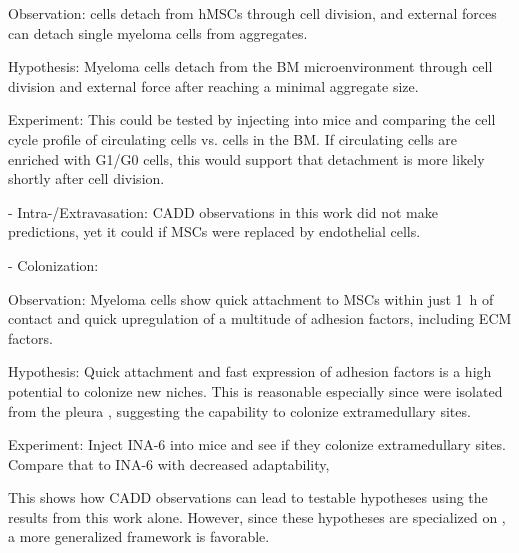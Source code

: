 Observation: \INA  cells detach from \acp{hMSC} through cell division, and external forces can detach
single myeloma cells from aggregates.

Hypothesis: Myeloma cells detach from the BM microenvironment through
cell division and external force after reaching a minimal aggregate size.

Experiment: This could be tested by injecting \INA  into mice and comparing the
cell cycle profile of circulating cells vs. cells in the BM. If circulating
cells are enriched with G1/G0 cells, this would support that detachment is more
likely shortly after cell division.


- Intra-/Extravasation: CADD observations in this work did not make predictions, yet it could if MSCs were replaced by endothelial cells.


- Colonization:

Observation: Myeloma cells show quick attachment to MSCs within just
\SI{1}{\hour} of contact and quick upregulation of a multitude of adhesion
factors, including \ac{ECM} factors.

Hypothesis: Quick attachment and fast expression of adhesion factors is a high
potential to colonize new niches. This is reasonable especially since \INA were
isolated from the pleura \cite{burgerGp130RasMediated2001c}, suggesting the
capability to colonize extramedullary sites.

Experiment: Inject INA-6 into mice and see if they colonize extramedullary
sites. Compare that to INA-6 with decreased adaptability,


This shows how CADD observations can lead to testable hypotheses using the
results from this work alone. However, since these hypotheses are specialized on
\INA, a more generalized framework is favorable.





\newcommand{\caddadaptation}{ %
      \ac{CADD} is adapted in response to different microenvironments faced
      during dissemination %
}
\newcommand{\caddadaptationtitle}{ %
      \textit{Hypothesis 1}: \ac{CADD} Adaptations during Dissemination%
}%


\newcommand{\caddadaptibility}{ %
      High adaptability of \ac{CADD} is a hallmark of aggressive myeloma %
}%
\newcommand{\caddadaptabilitytitle}{ %
      \textit{Hypothesis 2}: High Adaptability of \ac{CADD} and Myeloma
      Aggressiveness %
}%


\newcommand{\cadddiversity}{%
      \ac{CADD} is highly diverse within both patients and cell lines %
}%
\newcommand{\cadddiversitytitle}{ %
      \textit{Hypothesis 3}: \ac{CADD} is Highly Diverse Within both Patients
      and Cell Lines%
}%


